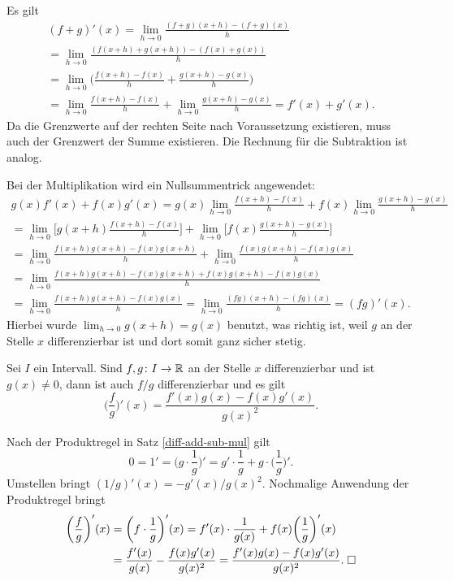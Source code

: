 \begin{Beweis} Es gilt
\begin{gather*}
(f+g)'(x)
= \lim_{h\to 0}\frac{(f+g)(x+h)-(f+g)(x)}{h}\\
= \lim_{h\to 0}\frac{(f(x+h)+g(x+h))-(f(x)+g(x))}{h}\\
= \lim_{h\to 0}\bigg(\frac{f(x+h)-f(x)}{h}+\frac{g(x+h)-g(x)}{h}\bigg)\\
= \lim_{h\to 0}\frac{f(x+h)-f(x)}{h}+\lim_{h\to 0}\frac{g(x+h)-g(x)}{h}
= f'(x)+g'(x).
\end{gather*}
Da die Grenzwerte auf der rechten Seite nach Voraussetzung existieren,
muss auch der Grenzwert der Summe existieren.
Die Rechnung für die Subtraktion ist analog.

Bei der Multiplikation wird ein Nullsummentrick angewendet:
\begin{gather*}
g(x)f'(x)+f(x)g'(x)
= g(x)\lim_{h\to 0}\frac{f(x+h)-f(x)}{h}
+ f(x)\lim_{h\to 0}\frac{g(x+h)-g(x)}{h}\\
= \lim_{h\to 0}\bigg[g(x+h)\frac{f(x+h)-f(x)}{h}\bigg]
+ \lim_{h\to 0}\bigg[f(x)\frac{g(x+h)-g(x)}{h}\bigg]\\
= \lim_{h\to 0}\frac{f(x+h)g(x+h)-f(x)g(x+h)}{h}
+ \lim_{h\to 0}\frac{f(x)g(x+h)-f(x)g(x)}{h}\\
= \lim_{h\to 0}\frac{f(x+h)g(x+h)-f(x)g(x+h)+f(x)g(x+h)-f(x)g(x)}{h}\\
= \lim_{h\to 0}\frac{f(x+h)g(x+h)-f(x)g(x)}{h}
= \lim_{h\to 0}\frac{(fg)(x+h)-(fg)(x)}{h}
= (fg)'(x).
\end{gather*}
Hierbei wurde $\lim_{h\to 0}g(x+h)=g(x)$ benutzt, was richtig ist,
weil $g$ an der Stelle $x$ differenzierbar ist und dort somit ganz
sicher stetig.\;\qedsymbol
\end{Beweis}

\newpage
\begin{Satz}
Sei $I$ ein Intervall. Sind $f,g\colon I\to\mathbb R$ an der Stelle
$x$ differenzierbar und ist $g(x)\ne 0$, dann
ist auch $f/g$ differenzierbar und es gilt
\[\bigg(\frac{f}{g}\bigg)'(x) = \frac{f'(x)g(x)-f(x)g'(x)}{g(x)^2}.\]
\end{Satz}
\begin{Beweis}
Nach der Produktregel in Satz \ref{diff-add-sub-mul} gilt
\[0 = 1' = \bigg(g\cdot\frac{1}{g}\bigg)'
= g'\cdot\frac{1}{g}+g\cdot \bigg(\frac{1}{g}\bigg)'.\]
Umstellen bringt $(1/g)'(x)=-g'(x)/g(x)^2$. Nochmalige Anwendung der
Produktregel bringt
\begin{align*}
\bigg(\frac{f}{g}\bigg)'(x)
&= \bigg(f\cdot\frac{1}{g}\bigg)'(x)
= f'(x)\cdot\frac{1}{g(x)}+f(x)\bigg(\frac{1}{g}\bigg)'(x)\\
&= \frac{f'(x)}{g(x)}-\frac{f(x)g'(x)}{g(x)^2}
= \frac{f'(x)g(x)-f(x)g'(x)}{g(x)^2}.\;\square
\end{align*}
\end{Beweis}

